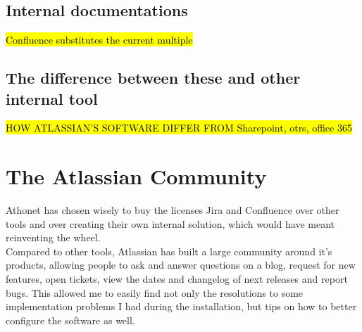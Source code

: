 	\subsection{Internal documentations}
		\hl{Confluence substitutes the current multiple }
		
	\subsection{The difference between these and other internal tool}
		\hl{HOW ATLASSIAN'S SOFTWARE DIFFER FROM Sharepoint, otrs, office 365}

\section{The Atlassian Community}
	Athonet has chosen wisely to buy the licenses Jira and Confluence over other tools and over creating their own internal solution, which would have meant reinventing the wheel.\\
	Compared to other tools, Atlassian has built a large community around it's products, allowing people to ask and answer questions on a blog, request for new features, open tickets, view the dates and changelog of next releases and report bugs.
	This allowed me to easily find not only the resolutions to some implementation problems I had during the installation, but tips on how to better configure the software as well.

